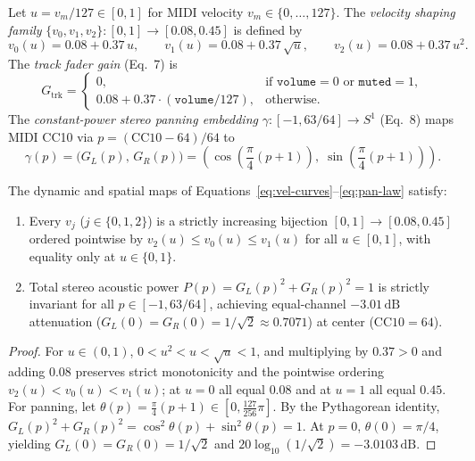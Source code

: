 \begin{definition}
Let $u = v_m / 127 \in [0, 1]$ for MIDI velocity $v_m \in \{0, \dots, 127\}$. The \emph{velocity shaping family} $\{v_0, v_1, v_2\} : [0, 1] \to [0.08, 0.45]$ is defined by
\begin{equation}
\label{eq:vel-curves}
v_0(u) = 0.08 + 0.37\,u, \qquad v_1(u) = 0.08 + 0.37\,\sqrt{u}, \qquad v_2(u) = 0.08 + 0.37\,u^2.
\end{equation}
The \emph{track fader gain} (Eq.~7) is
\begin{equation}
\label{eq:track-gain}
G_{\mathrm{trk}} =
\begin{cases}
0, & \text{if } \texttt{volume} = 0 \text{ or } \texttt{muted} = 1, \\
0.08 + 0.37 \cdot (\texttt{volume} / 127), & \text{otherwise.}
\end{cases}
\end{equation}
The \emph{constant-power stereo panning embedding} $\gamma : [-1, 63/64] \to S^1$ (Eq.~8) maps MIDI CC10 via $p = (\mathrm{CC10} - 64)/64$ to
\begin{equation}
\label{eq:pan-law}
\gamma(p) = \big(G_L(p),\, G_R(p)\big) = \left(\cos\!\left(\frac{\pi}{4}(p + 1)\right),\; \sin\!\left(\frac{\pi}{4}(p + 1)\right)\right).
\end{equation}
\end{definition}

\begin{theorem}
\label{thm:vel-pan}
The dynamic and spatial maps of Equations~\eqref{eq:vel-curves}--\eqref{eq:pan-law} satisfy:
\begin{enumerate}[leftmargin=1.5em]
  \item Every $v_j$ ($j \in \{0,1,2\}$) is a strictly increasing bijection $[0,1] \to [0.08, 0.45]$ ordered pointwise by $v_2(u) \le v_0(u) \le v_1(u)$ for all $u \in [0, 1]$, with equality only at $u \in \{0, 1\}$.
  \item Total stereo acoustic power $P(p) = G_L(p)^2 + G_R(p)^2 = 1$ is strictly invariant for all $p \in [-1, 63/64]$, achieving equal-channel $-3.01\,\text{dB}$ attenuation ($G_L(0) = G_R(0) = 1/\sqrt{2} \approx 0.7071$) at center ($\mathrm{CC10} = 64$).
\end{enumerate}
\end{theorem}

\begin{proof}
For $u \in (0, 1)$, $0 < u^2 < u < \sqrt{u} < 1$, and multiplying by $0.37 > 0$ and adding $0.08$ preserves strict monotonicity and the pointwise ordering $v_2(u) < v_0(u) < v_1(u)$; at $u = 0$ all equal $0.08$ and at $u = 1$ all equal $0.45$. For panning, let $\theta(p) = \frac{\pi}{4}(p+1) \in [0, \frac{127}{256}\pi]$. By the Pythagorean identity, $G_L(p)^2 + G_R(p)^2 = \cos^2\theta(p) + \sin^2\theta(p) = 1$. At $p = 0$, $\theta(0) = \pi/4$, yielding $G_L(0) = G_R(0) = 1/\sqrt{2}$ and $20\log_{10}(1/\sqrt{2}) = -3.0103\,\text{dB}$.
\end{proof}

